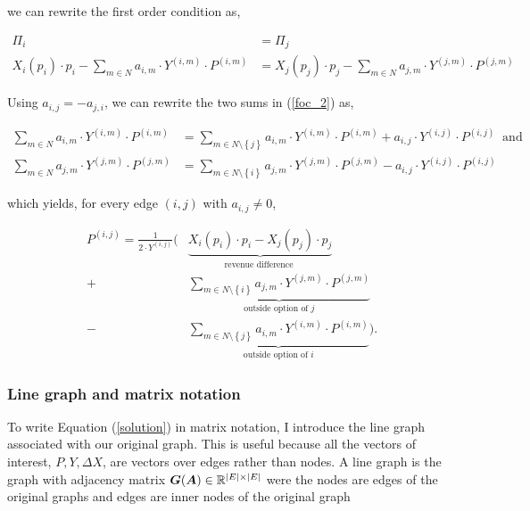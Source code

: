 \documentclass[american]{scrartcl}
\newcommand{\R}{\mathbb{R}}
\newcommand{\matr}[1]{\bm{#1}}
\newcommand{\set}[1]{\left\{#1\right\}}
\DeclarePairedDelimiter\abs{\lvert}{\rvert}%
\begin{document}
we can rewrite the first order condition as,

\begin{equation} \label{foc_2}
	\begin{split}
		\Pi_i &= \Pi_j \\
		X_i(p_i)\cdot p_i - \sum_{m \in N} a_{i, m} \cdot Y^{(i, m)} \cdot P^{(i, m)} &= X_j(p_j)\cdot p_j - \sum_{m \in N} a_{j, m} \cdot Y^{(j, m)} \cdot P^{(j, m)}
	\end{split}
\end{equation}

Using $a_{i, j} = - a_{j, i}$, we can rewrite the two sums in (\ref{foc_2}) as,

\begin{equation}
	\begin{split}
		\sum_{m \in N} a_{i, m} \cdot Y^{(i, m)} \cdot P^{(i, m)} &= \sum_{m \in N \setminus \set{j}}  a_{i, m} \cdot Y^{(i, m)} \cdot P^{(i, m)} + a_{i, j} \cdot Y^{(i, j)} \cdot P^{(i, j)} \ \text{ and }\\
		\sum_{m \in N} a_{j, m} \cdot Y^{(j, m)} \cdot P^{(j, m)} &=  \sum_{m \in N \setminus \set{i}}  a_{j, m} \cdot Y^{(j, m)} \cdot P^{(j, m)} - a_{i, j} \cdot Y^{(i, j)} \cdot P^{(i, j)}
	\end{split}
\end{equation}

which yields, for every edge $(i, j)$ with $ a_{i, j} \neq 0$,

\begin{equation} \label{solution}
	\begin{split}
		P^{(i, j)} = \frac{1}{2\cdot Y^{(i, j)}} \Biggl( &\underbrace{X_i(p_i)\cdot p_i - X_j(p_j)\cdot p_j}_{\text{revenue difference }}
		\\  + &\underbrace{\sum_{m\in N\setminus \set{i}} a_{j, m} \cdot Y^{(j, m)} \cdot P^{(j, m)}}_{\text{outside option of } j}
		\\ - & \underbrace{\sum_{m \in N\setminus \set{j}} a_{i, m} \cdot Y^{(i, m)} \cdot P^{(i, m)}}_{\text{outside option of } i} \Biggr).
	\end{split}
\end{equation}

\subsubsection{Line graph and matrix notation}


To write Equation (\ref{solution}) in matrix notation, I introduce the line graph associated with our original graph. This is useful because all the vectors of interest, $P, Y, \Delta X$, are vectors over edges rather than nodes. A line graph is the graph with adjacency matrix $\matr{G}(\matr{A}) \in \R^{\abs{E} \times \abs{E}}$ were the nodes are edges of the original graphs and edges are inner nodes of the original graph
\end{document}
